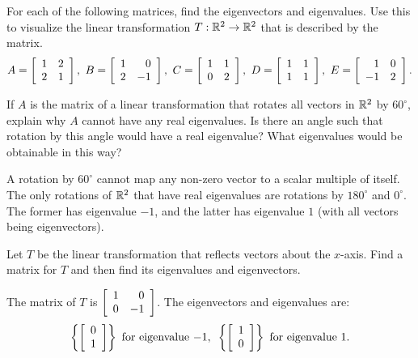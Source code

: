 \documentclass{ximera}
\author{Zack Reed}
\begin{document}
\begin{problem}
  For each of the following matrices, find the eigenvectors and
  eigenvalues. Use this to visualize the linear transformation
  $T:\R^2\to\R^2$ that is described by the matrix.
  \begin{equation*}
    A = \startmat{rr}
      1 & 2 \\
      2 & 1 \\
    \stopmat,
    \quad
    B = \startmat{rr}
      1 & 0 \\
      2 & -1 \\
    \stopmat,
    \quad
    C = \startmat{rr}
      1 & 1 \\
      0 & 2 \\
    \stopmat,
    \quad
    D = \startmat{rr}
      1 & 1 \\
      1 & 1 \\
    \stopmat,
    \quad
    E = \startmat{rr}
      1 & 0 \\
      -1 & 2 \\
    \stopmat.
  \end{equation*}
\end{problem}

\begin{problem}
  If $A$ is the matrix of a linear transformation that rotates all
  vectors in $\R^2$ by $60^{\circ}$, explain why $A$ cannot have any
  real eigenvalues. Is there an angle such that rotation by this
  angle would have a real eigenvalue? What eigenvalues would be
  obtainable in this way?
  \begin{solution}
    A rotation by $60^{\circ}$ cannot map any non-zero vector to a
    scalar multiple of itself. The only rotations of $\R^2$ that have
    real eigenvalues are rotations by $180^{\circ}$ and $0^{\circ}$.
    The former has eigenvalue $-1$, and the latter has eigenvalue $1$
    (with all vectors being eigenvectors).
  \end{solution}
\end{problem}

\begin{problem}
  Let $T$ be the linear transformation that reflects vectors about
  the $x$-axis. Find a matrix for $T$ and then find its eigenvalues and
  eigenvectors.
  \begin{solution}
    The matrix of $T$ is $\startmat{rr}
      1 & 0 \\
      0 & -1
    \stopmat$. The eigenvectors and eigenvalues are:
    \begin{equation*}
      \set{\startmat{c}
          0 \\
          1
        \stopmat} ~\mbox{for eigenvalue}~ {-1},
      \quad\set{\startmat{c}
          1 \\
          0
        \stopmat} ~\mbox{for eigenvalue}~ {1}.
    \end{equation*}
  \end{solution}
\end{problem}
\end{document}
